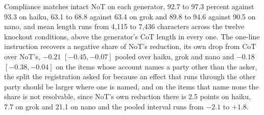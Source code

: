 Compliance matches intact NoT on each generator, 92.7 to
97.3 percent against 93.3 on haiku, 63.1 to 68.8 against 63.4 on grok and
89.8 to 94.6 against 90.5 on nano, and mean length runs from 4,115 to 7,436
characters across the twelve knockout conditions, above the generator's CoT
length in every one.
The one-line instruction recovers a negative share of NoT's reduction, its
own drop from CoT over NoT's, $-0.21$ $[-0.45, -0.07]$ pooled over haiku,
grok and nano and $-0.18$ $[-0.38, -0.04]$ on the items whose account names a
party other than the asker, the split the registration asked for because an
effect that runs through the other party should be larger where one is named,
and on the items that name none the share is not resolvable, since NoT's own reduction there is 2.5 points on haiku, 7.7 on
grok and 21.1 on nano and the pooled interval runs from $-2.1$ to $+1.8$.

